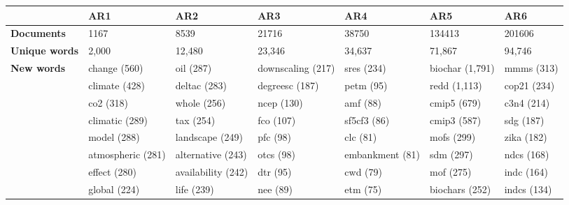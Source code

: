 \begin{tabular}{l p{2.8cm} p{2.8cm} p{2.8cm} p{2.8cm} p{2.8cm} p{2.8cm}} 
&\textbf{AR1} & \textbf{AR2} & \textbf{AR3} & \textbf{AR4} & \textbf{AR5} & \textbf{AR6}\\ \hline\textbf{Documents} &1167 & 8539 & 21716 & 38750 & 134413 & 201606\\ 
\textbf{Unique words} &2,000 & 12,480 & 23,346 & 34,637 & 71,867 & 94,746\\ 
\textbf{New words} & change (560) & oil (287) & downscaling (217) & sres (234) & biochar (1,791) & mmms (313)\\ & climate (428) & deltac (283) & degreesc (187) & petm (95) & redd (1,113) & cop21 (234)\\ & co2 (318) & whole (256) & ncep (130) & amf (88) & cmip5 (679) & c3n4 (214)\\ & climatic (289) & tax (254) & fco (107) & sf5cf3 (86) & cmip3 (587) & sdg (187)\\ & model (288) & landscape (249) & pfc (98) & clc (81) & mofs (299) & zika (182)\\ & atmospheric (281) & alternative (243) & otcs (98) & embankment (81) & sdm (297) & ndcs (168)\\ & effect (280) & availability (242) & dtr (95) & cwd (79) & mof (275) & indc (164)\\ & global (224) & life (239) & nee (89) & etm (75) & biochars (252) & indcs (134)
\end{tabular}